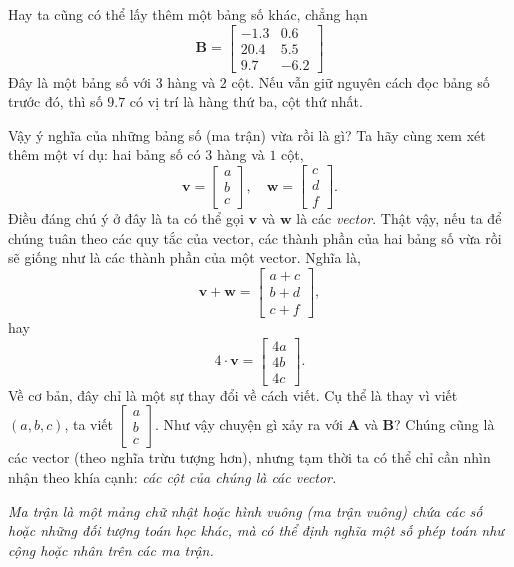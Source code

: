 Hay ta cũng có thể lấy thêm một bảng số khác, chẳng hạn
\[\mathbf{B}=\begin{bmatrix}
    -1.3&0.6\\
    20.4&5.5\\
    9.7&-6.2
\end{bmatrix}\] Đây là một bảng số với \(3\) hàng và \(2\) cột. Nếu vẫn giữ nguyên cách đọc bảng số trước đó, thì số \(9.7\) có vị trí là hàng thứ ba, cột thứ nhất. 

Vậy ý nghĩa của những bảng số (ma trận) vừa rồi là gì? Ta hãy cùng xem xét thêm một ví dụ: hai bảng số có \(3\) hàng và \(1\) cột, 
\[\mathbf{v}=\begin{bmatrix}
    a\\b\\c
\end{bmatrix}, \quad \mathbf{w}=\begin{bmatrix}
    c\\d\\f
\end{bmatrix}.
\] Điều đáng chú ý ở đây là ta có thể gọi \(\mathbf{v}\) và \(\mathbf{w}\) là các \emph{vector}. Thật vậy, nếu ta để chúng tuân theo các quy tắc của vector, các thành phần của hai bảng số vừa rồi sẽ giống như là các thành phần của một vector. 
Nghĩa là, \[\mathbf{v}+\mathbf{w}=\begin{bmatrix}
    a+c\\b+d\\c+f
\end{bmatrix},\] hay \[
    4\cdot\mathbf{v}=\begin{bmatrix}
        4a\\4b\\4c
\end{bmatrix}.\]
Về cơ bản, đây chỉ là một sự thay đổi về cách viết. Cụ thể là thay vì viết \((a,b,c)\), ta viết \(\begin{bmatrix}
    a\\b\\c
\end{bmatrix}\). Như vậy chuyện gì xảy ra với  \(\mathbf{A}\) và \(\mathbf{B} \)? Chúng cũng là các vector (theo nghĩa trừu tượng hơn), nhưng tạm thời ta có thể chỉ cần nhìn nhận theo khía cạnh: \emph{các cột của chúng là các vector. }
\vspace{8pt}

    \emph{Ma trận là một mảng chữ nhật hoặc hình vuông (ma trận vuông) chứa các số hoặc những đối tượng toán học khác, mà có thể định nghĩa một số phép toán như cộng hoặc nhân trên các ma trận.}
\vspace{8pt}

